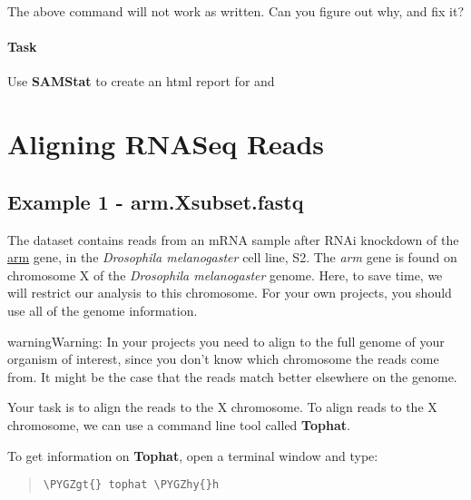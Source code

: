 \documentclass[a4paper,11pt,english]{sphinxmanual}
\def\PYGZgt{\char`\>}
\def\PYGZhy{\char`\-}
\begin{document}
The above command will not work as written. Can you figure out why, and fix it?


\subsubsection{Task}
\label{exercises/STEP1_QualityControl:id1}
Use \textbf{SAMStat} to create an html report for  and 


\chapter{Aligning RNASeq Reads}
\label{exercises/STEP2_alignRNASeqReads:tophat}\label{exercises/STEP2_alignRNASeqReads::doc}\label{exercises/STEP2_alignRNASeqReads:aligning-rnaseq-reads}

\section{Example 1 - arm.Xsubset.fastq}
\label{exercises/STEP2_alignRNASeqReads:example-1-arm-xsubset-fastq}
The dataset  contains reads from an mRNA sample after RNAi knockdown of the \href{http://flybase.org/reports/FBgn0000117.html}{arm} gene, in the \emph{Drosophila melanogaster} cell line, S2. The \emph{arm} gene is found on chromosome X of the \emph{Drosophila melanogaster} genome. Here, to save time, we will restrict our analysis to this chromosome. For your own projects, you should use all of the genome information.

\begin{notice}{warning}{Warning:}
In your projects you need to align to the full genome of your organism of interest, since you don't know which chromosome the reads come from. It might be the case that the reads match better elsewhere on the genome.
\end{notice}

Your task is to align the reads to the X chromosome. To align reads to the X chromosome, we can use a command line tool called \textbf{Tophat}.

To get information on \textbf{Tophat}, open a terminal window and type:
\begin{quote}

\begin{Verbatim}[frame=single, rulecolor=\color{lightgray}, fontfamily=courier, commandchars=\\\{\}]
\PYGZgt{} tophat \PYGZhy{}h
\end{Verbatim}
\end{quote}
\end{document}
